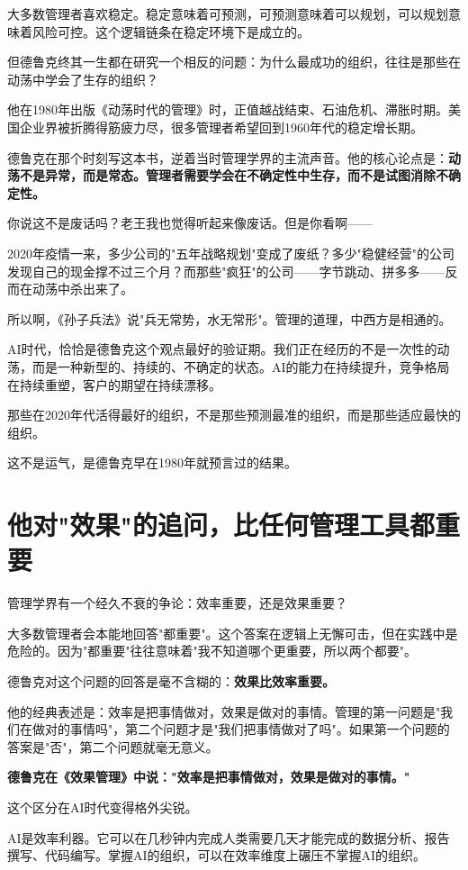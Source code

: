 大多数管理者喜欢稳定。稳定意味着可预测，可预测意味着可以规划，可以规划意味着风险可控。这个逻辑链条在稳定环境下是成立的。

但德鲁克终其一生都在研究一个相反的问题：为什么最成功的组织，往往是那些在动荡中学会了生存的组织？

他在1980年出版《动荡时代的管理》时，正值越战结束、石油危机、滞胀时期。美国企业界被折腾得筋疲力尽，很多管理者希望回到1960年代的稳定增长期。

德鲁克在那个时刻写这本书，逆着当时管理学界的主流声音。他的核心论点是：\textbf{动荡不是异常，而是常态。管理者需要学会在不确定性中生存，而不是试图消除不确定性。}

你说这不是废话吗？老王我也觉得听起来像废话。但是你看啊——

2020年疫情一来，多少公司的"五年战略规划"变成了废纸？多少"稳健经营"的公司发现自己的现金撑不过三个月？而那些"疯狂"的公司——字节跳动、拼多多——反而在动荡中杀出来了。

所以啊，《孙子兵法》说"兵无常势，水无常形"。管理的道理，中西方是相通的。

AI时代，恰恰是德鲁克这个观点最好的验证期。我们正在经历的不是一次性的动荡，而是一种新型的、持续的、不确定的状态。AI的能力在持续提升，竞争格局在持续重塑，客户的期望在持续漂移。

那些在2020年代活得最好的组织，不是那些预测最准的组织，而是那些适应最快的组织。

这不是运气，是德鲁克早在1980年就预言过的结果。


\section{他对"效果"的追问，比任何管理工具都重要}


管理学界有一个经久不衰的争论：效率重要，还是效果重要？

大多数管理者会本能地回答"都重要"。这个答案在逻辑上无懈可击，但在实践中是危险的。因为"都重要"往往意味着"我不知道哪个更重要，所以两个都要"。

德鲁克对这个问题的回答是毫不含糊的：\textbf{效果比效率重要。}

他的经典表述是：效率是把事情做对，效果是做对的事情。管理的第一问题是"我们在做对的事情吗"，第二个问题才是"我们把事情做对了吗"。如果第一个问题的答案是"否"，第二个问题就毫无意义。

\textbf{德鲁克在《效果管理》中说："效率是把事情做对，效果是做对的事情。"}

这个区分在AI时代变得格外尖锐。

AI是效率利器。它可以在几秒钟内完成人类需要几天才能完成的数据分析、报告撰写、代码编写。掌握AI的组织，可以在效率维度上碾压不掌握AI的组织。

